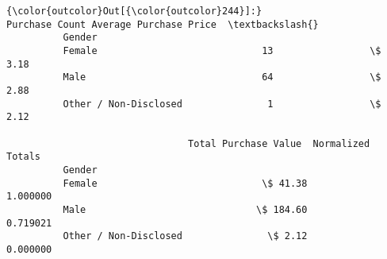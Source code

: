 \documentclass[11pt]{article}
\begin{document}
\begin{Verbatim}[commandchars=\\\{\}]
{\color{outcolor}Out[{\color{outcolor}244}]:}                        Purchase Count Average Purchase Price  \textbackslash{}
          Gender                                                         
          Female                             13                 \$ 3.18   
          Male                               64                 \$ 2.88   
          Other / Non-Disclosed               1                 \$ 2.12   
          
                                Total Purchase Value  Normalized Totals  
          Gender                                                         
          Female                             \$ 41.38           1.000000  
          Male                              \$ 184.60           0.719021  
          Other / Non-Disclosed               \$ 2.12           0.000000  
\end{Verbatim}
            
\end{document}
